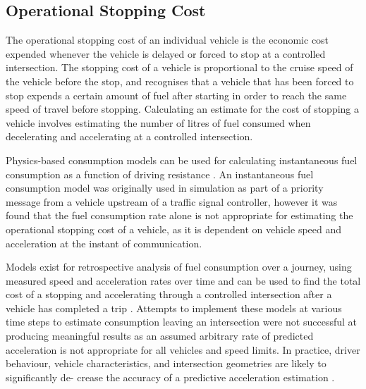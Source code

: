 \subsection{Operational Stopping Cost}

The operational stopping cost of an individual vehicle is the economic cost expended whenever the vehicle is delayed or forced to stop at a controlled intersection. The stopping cost of a vehicle is proportional to the cruise speed of the vehicle before the stop, and recognises that a vehicle that has been forced to stop expends a certain amount of fuel after starting in order to reach the same speed of travel before stopping. Calculating an estimate for the cost of stopping a vehicle involves estimating the number of litres of fuel consumed when decelerating and accelerating at a controlled intersection.

Physics-based consumption models can be used for calculating instantaneous fuel consumption as a function of driving resistance \cite{kesting2013traffic}. An instantaneous fuel consumption model was originally used in simulation as part of a priority message from a vehicle upstream of a traffic signal controller, however it was found that the fuel consumption rate alone is not appropriate for estimating the operational stopping cost of a vehicle, as it is dependent on vehicle speed and acceleration at the instant of communication.

Models exist for retrospective analysis of fuel consumption over a journey, using measured speed and acceleration rates over time and can be used to find the total cost of a stopping and accelerating through a controlled intersection after a vehicle has completed a trip \cite{kesting2013traffic,akcelik2003fuel,trieber2008congestion}. Attempts to implement these models at various time steps to estimate consumption leaving an intersection were not successful at producing meaningful results as an assumed arbitrary rate of predicted acceleration is not appropriate for all vehicles and speed limits. In practice, driver behaviour, vehicle characteristics, and intersection geometries are likely to significantly de- crease the accuracy of a predictive acceleration estimation \cite{kesting2013traffic}.

